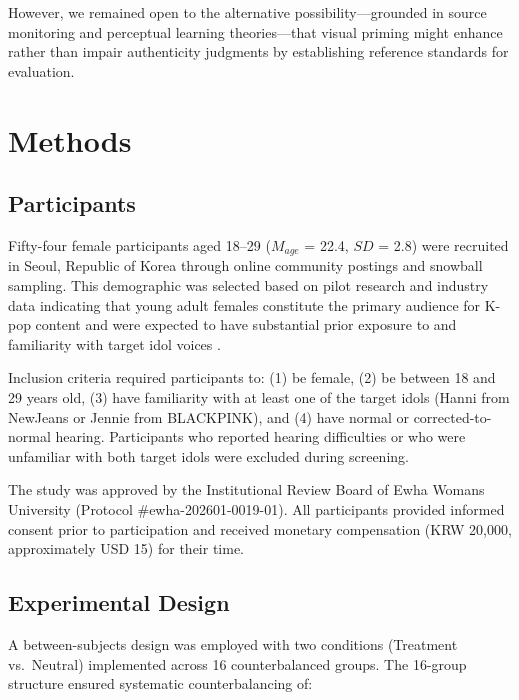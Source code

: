 \documentclass[12pt, a4paper]{article}
\begin{document}
However, we remained open to the alternative possibility---grounded in source monitoring and perceptual learning theories---that visual priming might enhance rather than impair authenticity judgments by establishing reference standards for evaluation.


\section{Methods}

\subsection{Participants}

Fifty-four female participants aged 18--29 ($M_{age}$ = 22.4, $SD$ = 2.8) were recruited in Seoul, Republic of Korea through online community postings and snowball sampling. This demographic was selected based on pilot research and industry data indicating that young adult females constitute the primary audience for K-pop content and were expected to have substantial prior exposure to and familiarity with target idol voices \citep{yoon2019kpop}.

Inclusion criteria required participants to: (1) be female, (2) be between 18 and 29 years old, (3) have familiarity with at least one of the target idols (Hanni from NewJeans or Jennie from BLACKPINK), and (4) have normal or corrected-to-normal hearing. Participants who reported hearing difficulties or who were unfamiliar with both target idols were excluded during screening.

The study was approved by the Institutional Review Board of Ewha Womans University (Protocol \#ewha-202601-0019-01). All participants provided informed consent prior to participation and received monetary compensation (KRW 20,000, approximately USD 15) for their time.

\subsection{Experimental Design}

A between-subjects design was employed with two conditions (Treatment vs.\ Neutral) implemented across 16 counterbalanced groups. The 16-group structure ensured systematic counterbalancing of:
\end{document}
